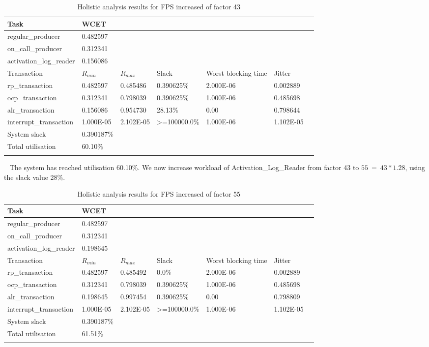 \documentclass{article}
\begin{document}
\begin{longtable}{lllllll}
   \toprule
   Task & WCET \\
   \midrule
   regular\_producer & 0.482597 \\
   on\_call\_producer & 0.312341 \\
   activation\_log\_reader & 0.156086 \\
   \toprule
   \toprule
   Transaction & $R_{min}$ & $R_{max}$ & Slack & Worst blocking time & Jitter \\
   \midrule
   rp\_transaction & 0.482597 & 0.485486  & 0.390625\% &  2.000E-06 & 0.002889 \\
   ocp\_transaction & 0.312341 & 0.798039 & 0.390625\% & 1.000E-06 & 0.485698 \\
   alr\_transaction & 0.156086 & 0.954730 & 28.13\% & 0.00 & 0.798644 \\
   interrupt\_transaction & 1.000E-05 & 2.102E-05 & >=100000.0\% & 1.000E-06 & 1.102E-05 \\
   \toprule
   \toprule
   System slack & 0.390187\% \\
   Total utilisation & 60.10\% \\
   \bottomrule
   \caption{Holistic analysis results for FPS increased of factor 43}
\label{tab:holistic-fps-24-ocp-44}
\end{longtable}
 
The system has reached utilisation 60.10\%. We now increase workload of Activation\_Log\_Reader from factor 43 to $55\ =\ 43 * 1.28$, using the slack value 28\%.

\begin{longtable}{lllllll}
   \toprule
   Task & WCET \\
   \midrule
   regular\_producer & 0.482597 \\
   on\_call\_producer & 0.312341 \\
   activation\_log\_reader & 0.198645 \\
   \toprule
   \toprule
   Transaction & $R_{min}$ & $R_{max}$ & Slack & Worst blocking time & Jitter \\
   \midrule
   rp\_transaction & 0.482597 & 0.485492  & 0.0\% &  2.000E-06 & 0.002889 \\
   ocp\_transaction & 0.312341 & 0.798039 & 0.390625\% & 1.000E-06 & 0.485698 \\
   alr\_transaction & 0.198645 & 0.997454 & 0.390625\% & 0.00 & 0.798809 \\
   interrupt\_transaction & 1.000E-05 & 2.102E-05 & >=100000.0\% & 1.000E-06 & 1.102E-05 \\
   \toprule
   \toprule
   System slack & 0.390187\% \\
   Total utilisation & 61.51\% \\
   \bottomrule
   \caption{Holistic analysis results for FPS increased of factor 55}
\label{tab:holistic-fps-24-ocp-44-alr-56}
\end{longtable}
\end{document}
